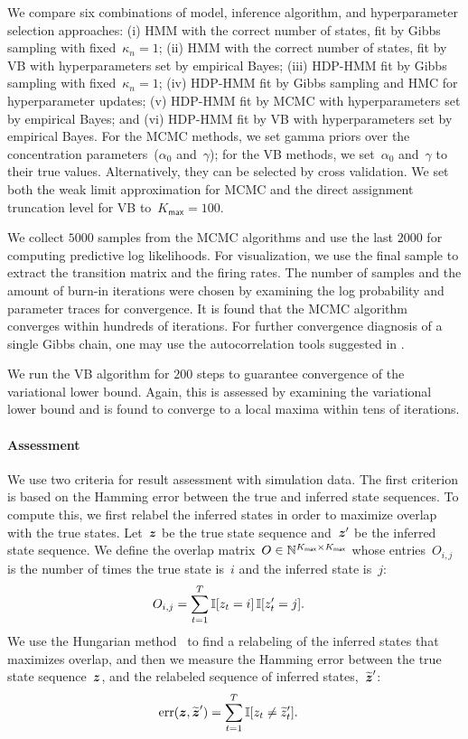 We compare six combinations of model, inference algorithm, and
hyperparameter selection approaches: (i) HMM with the correct number
of states, fit by Gibbs sampling with fixed~$\kappa_n=1$; (ii) HMM
with the correct number of states, fit by VB with hyperparameters set
by empirical Bayes; (iii) HDP-HMM fit by Gibbs sampling with
fixed~$\kappa_n=1$; (iv) HDP-HMM fit by Gibbs sampling and HMC for
hyperparameter updates; (v) HDP-HMM fit by MCMC with hyperparameters
set by empirical Bayes; and (vi) HDP-HMM fit by VB with
hyperparameters set by empirical Bayes. For the MCMC methods, we set
gamma priors over the concentration parameters~($\alpha_0$
and~$\gamma$); for the VB methods, we set~$\alpha_0$ and~$\gamma$ to
their true values. Alternatively, they can be selected by cross
validation. We set both the weak limit approximation for MCMC and the
direct assignment truncation level for VB to~${K_{\mathsf{max}}=100}$.

We collect $5000$ samples from the MCMC algorithms and use the last $2000$
for computing predictive log likelihoods. For visualization, we use
the final sample to extract the transition matrix and the firing
rates. The number of samples and the amount of burn-in iterations were
chosen by examining the log probability and parameter traces for
convergence. It is found that the MCMC algorithm converges within
hundreds of iterations. For further convergence diagnosis of a single
Gibbs chain, one may use the autocorrelation tools suggested in
\citep{RafteryLewis92,Cowles96}.

We run the VB algorithm for $200$ steps to guarantee convergence of the
variational lower bound. Again, this is assessed by examining the
variational lower bound and is found to converge to a local maxima
within tens of iterations.


\paragraph{Assessment} 

We use two criteria for result assessment with simulation data.  The
first criterion is based on the Hamming error between the true and
inferred state sequences. To compute this, we first relabel the
inferred states in order to maximize overlap with the true
states. Let~$\boldsymbol{z}$ be the true state sequence
and~$\boldsymbol{z}'$ be the inferred state sequence. We define the
overlap matrix~$O \in \mathbb{N}^{K_{\mathsf{max}} \times K_{\mathsf{max}}}$ whose entries~$O_{i,j}$
is the number of times the true state is~$i$ and the inferred state
is~$j$:
\begin{align*}
O_{i,j} &= \sum_{t=1}^T \mathbb{I}[z_t=i] \, \mathbb{I}[z'_t=j].
\end{align*}
We use the Hungarian method~\citep{kuhn1955hungarian} to find a
relabeling of the inferred states that maximizes overlap, and then we
measure the Hamming error between the true state
sequence~$\boldsymbol{z}$, and the relabeled sequence of inferred
states,~$\widetilde{\boldsymbol{z}}'$:
\begin{align}
\label{eq:hamming}
\text{err}(\boldsymbol{z}, \widetilde{\boldsymbol{z}}') &= \sum_{t=1}^T \mathbb{I}[z_t \neq \widetilde{z}'_t].
\end{align}


